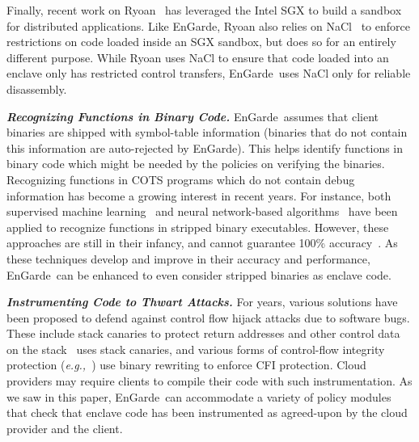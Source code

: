 \documentclass[conference,compsoc]{IEEEtran}
\newcommand{\myparagraph}[1]{\parskip -4pt \indent\par\noindent\textbf{\textit{#1}} \parskip 0pt}
\newcommand{\eg}{\textit{e.g.,}\xspace}
\newcommand{\tool}{EnGarde\xspace} %
\begin{document}
Finally, recent work on Ryoan~\cite{hunt:osdi16} has leveraged the Intel SGX to
build a sandbox for distributed applications. Like \tool, Ryoan also relies on
NaCl~\cite{nativeclient:oak09} to enforce restrictions on code loaded inside an
SGX sandbox, but does so for an entirely different purpose. While Ryoan uses
NaCl to ensure that code loaded into an enclave only has restricted control
transfers, \tool\ uses NaCl only for reliable disassembly.

\myparagraph{Recognizing Functions in Binary Code.} \tool\ assumes that client
binaries are shipped with symbol-table information (binaries that do not
contain this information are auto-rejected by \tool). This helps identify
functions in binary code which might be needed by the policies on verifying the
binaries. Recognizing functions in COTS programs which do not contain debug
information has become a growing interest in recent years.  For instance, both 
supervised machine learning~\cite{binaryanalysis:AAAI08} and neural
network-based algorithms~\cite{functionrecognizing:usenixsec15} have been
applied to recognize functions in stripped binary executables. However, these
approaches are still in their infancy, and cannot guarantee 100\%
accuracy~\cite{functionrecognizing:usenixsec15}. As these techniques develop
and improve in their accuracy and performance, \tool\ can be enhanced to even
consider stripped binaries as enclave code.

\myparagraph{Instrumenting Code to Thwart Attacks.} For years, various
solutions have been proposed to defend against control flow hijack attacks due
to software bugs. These include stack canaries to protect return addresses and
other control data on the stack~\cite{stackcanaries:handbookofinfosec} uses
stack canaries, and various forms of control-flow integrity protection
(\eg~\cite{xfi:osdi06, mip:ccs13, hypersafe:oak10,edgecfi:sec14}) use binary
rewriting to enforce CFI protection. Cloud providers may require clients to
compile their code with such instrumentation. As we saw in this paper, \tool\
can accommodate a variety of policy modules that check that enclave code has
been instrumented as agreed-upon by the cloud provider and the client.

\end{document}
